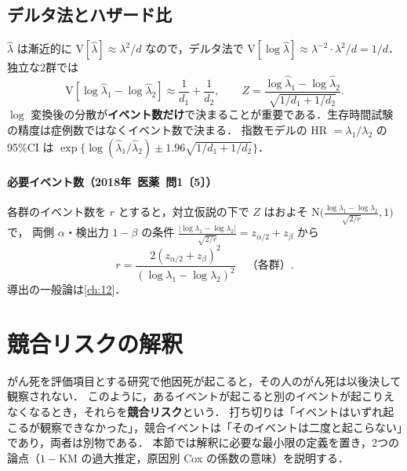 \documentclass[a4paper,11pt,openany]{ltjsbook}
\newcommand{\tagbox}[2]{\tcbox[on line,boxsep=0.5pt,left=2pt,right=2pt,top=0.5pt,bottom=0.5pt,
  colframe=#1,colback=#1!10,boxrule=0.4pt,arc=1pt]{\scriptsize\bfseries\textcolor{#1}{#2}}}
\newcommand{\Hissu}{\tagbox{bkred}{必須}}
\newcommand{\Youchui}{\tagbox{bkpurple}{要注意}}
\newcommand{\kakomon}[2]{\mbox{#1年 医薬 問#2}}
\newcommand{\V}{\mathrm{V}}
\newcommand{\Normal}{\mathrm{N}}
\newcommand{\emphx}[1]{\textbf{\textcolor{bkblue}{#1}}}
\begin{document}
\subsection{デルタ法とハザード比}\label{subsec:10-expdelta}
$\hat\lambda$ は漸近的に $\V[\hat\lambda]\approx\lambda^2/d$ なので，デルタ法で $\V[\log\hat\lambda]\approx\lambda^{-2}\cdot\lambda^2/d=1/d$．
独立な2群では
\begin{equation}
\V[\log\hat\lambda_1-\log\hat\lambda_2]\approx\frac{1}{d_1}+\frac{1}{d_2},\qquad
Z=\frac{\log\hat\lambda_1-\log\hat\lambda_2}{\sqrt{1/d_1+1/d_2}}.\label{eq:10-expz}
\end{equation}
$\log$ 変換後の分散が\textbf{イベント数だけ}で決まることが重要である．生存時間試験の精度は症例数ではなくイベント数で決まる．
指数モデルの HR $=\lambda_1/\lambda_2$ の95\%CI は $\exp\{\log(\hat\lambda_1/\hat\lambda_2)\pm1.96\sqrt{1/d_1+1/d_2}\}$．

\paragraph{必要イベント数（\kakomon{2018}{1}〔5〕）}
各群のイベント数を $r$ とすると，対立仮説の下で $Z$ はおよそ $\Normal\bigl(\frac{\log\lambda_1-\log\lambda_2}{\sqrt{2/r}},1\bigr)$ で，
両側 $\alpha$・検出力 $1-\beta$ の条件 $\frac{|\log\lambda_1-\log\lambda_2|}{\sqrt{2/r}}=z_{\alpha/2}+z_\beta$ から
\begin{equation}
r=\frac{2(z_{\alpha/2}+z_\beta)^2}{(\log\lambda_1-\log\lambda_2)^2}\quad\text{（各群）}.\label{eq:10-events}
\end{equation}
導出の一般論は\cref{ch:12}．

\section{競合リスクの解釈}\label{sec:10-compete}
\Hissu
がん死を評価項目とする研究で他因死が起こると，その人のがん死は以後決して観察されない．
このように，あるイベントが起こると別のイベントが起こりえなくなるとき，それらを\emphx{競合リスク}という．
\Youchui 打ち切りは「イベントはいずれ起こるが観察できなかった」，競合イベントは「そのイベントは二度と起こらない」であり，両者は別物である．
本節では解釈に必要な最小限の定義を置き，2つの論点（$1-\mathrm{KM}$ の過大推定，原因別 Cox の係数の意味）を説明する．
\end{document}
